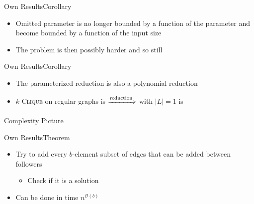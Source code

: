 \begin{frame}{Own Results}{Corollary}
    \begin{center}
    \end{center}

    \begin{itemize}
        \item Omitted parameter is no longer bounded by a function of the parameter and become bounded by a function of the input size
        \item The problem is then possibly harder and so still \Wh
    \end{itemize}
\end{frame}

\begin{frame}{Own Results}{Corollary}
    \begin{center}
    \end{center}

    \begin{itemize}
        \item The parameterized reduction is also a polynomial reduction
        \item $k$-\textsc{Clique} on regular graphs is \NPh $\xRightarrow{\text{reduction}}$ \HLshort with $|L|=1$ is \NPh
    \end{itemize}
\end{frame}

\begin{frame}{\HLdeg Complexity Picture}
    
\end{frame}

\begin{frame}{Own Results}{Theorem}
    \begin{center}
    \end{center}

    \begin{itemize}
        \item Try to add every $b$-element subset of edges that can be added between followers
        \begin{itemize}
            \item Check if it is a solution
        \end{itemize}
        \item Can be done in time $n^{\mathcal{O}(b)}$
    \end{itemize}
\end{frame}

